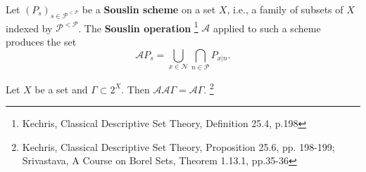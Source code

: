 \begin{definition}
Let $(P_s)_{s\in\mathcal{P}^{<\mathcal{P}}}$ be a \textbf{Souslin scheme}
on a set $X$, i.e., a family of subsets of $X$ indexed by
$\mathcal{P}^{<\mathcal{P}}$. The \textbf{Souslin operation}
\footnote{Kechris, Classical Descriptive Set Theory, Definition 25.4, p.198}
$\mathcal{A}$ applied to such a scheme produces the set
\[
  \mathcal{A} P_s 
    = \bigcup_{x\in\mathcal{N}} \bigcap_{n\in\mathcal{P}} P_{x|n}.
\]
\end{definition}


\begin{proposition} \label{P:souslin_idem}
Let $X$ be a set and $\Gamma\subset 2^X$. Then 
$\mathcal{A}\mathcal{A}\Gamma=\mathcal{A}\Gamma$.
  \footnote{Kechris, Classical Descriptive Set Theory, Proposition 25.6, 
    pp. 198-199; Srivastava, A Course on Borel Sets, Theorem 1.13.1, pp.35-36}
\end{proposition}
